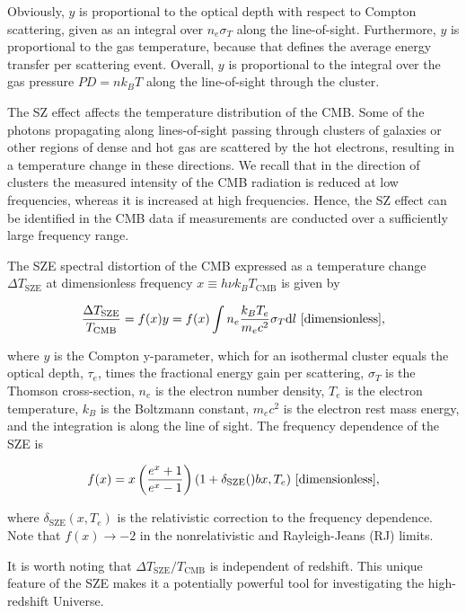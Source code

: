 \documentclass[a4paper,11pt]{article}
\begin{document}
{\noindent}Obviously, $y$ is proportional to the optical depth with respect to Compton scattering, given as an integral over $n_e\sigma_T$ along the line-of-sight. Furthermore, $y$ is proportional to the gas temperature, because that defines the average energy transfer per scattering event. Overall, $y$ is proportional to the integral over the gas pressure $P D=nk_BT$ along the line-of-sight through the cluster.

{\noindent}The SZ effect affects the temperature distribution of the CMB. Some of the photons propagating along lines-of-sight passing through clusters of galaxies or other regions of dense and hot gas are scattered by the hot electrons, resulting in a temperature change in these directions. We recall that in the direction of clusters the measured intensity of the CMB radiation is reduced at low frequencies, whereas it is increased at high frequencies. Hence, the SZ effect can be identified in the CMB data if measurements are conducted over a sufficiently large frequency range.

{\noindent}The SZE spectral distortion of the CMB expressed as a temperature change $\Delta T_\mathrm{SZE}$ at dimensionless frequency $x\equiv h\nu k_BT_\mathrm{CMB}$ is given by

\begin{align*}
    \frac{\Delta T_\mathrm{SZE}}{T_\mathrm{CMB}} = f(x)y = f(x)\int n_e\frac{k_BT_e}{m_ec^2}\sigma_T \mathrm{d}l ~ [{\rm dimensionless}],
\end{align*}

{\noindent}where $y$ is the Compton y-parameter, which for an isothermal cluster equals the optical depth, $\tau_e$, times the fractional energy gain per scattering, $\sigma_T$ is the Thomson cross-section, $n_e$ is the electron number density, $T_e$ is the electron temperature, $k_B$ is the Boltzmann constant, $m_ec^2$ is the electron rest mass energy, and the integration is along the line of sight. The frequency dependence of the SZE is 

\begin{align*}
    f(x) = x\left(\frac{e^x+1}{e^x-1}\right)(1+\delta_\mathrm{SZE}()bx,T_e) ~ [{\rm dimensionless}],
\end{align*}

{\noindent}where $\delta_\mathrm{SZE}(x,T_e)$ is the relativistic correction to the frequency dependence. Note that $f(x)\rightarrow-2$ in the nonrelativistic and Rayleigh-Jeans (RJ) limits.

{\noindent}It is worth noting that $\Delta T_\mathrm{SZE}/T_\mathrm{CMB}$ is independent of redshift. This unique feature of the SZE makes it a potentially powerful tool for investigating the high-redshift Universe.
\end{document}
